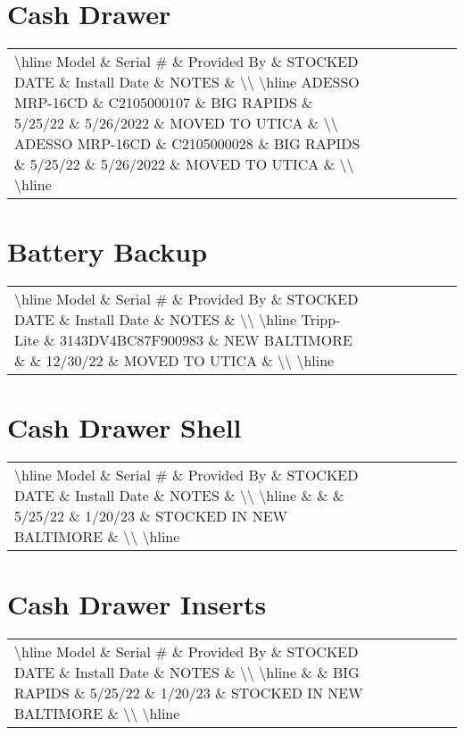 \documentclass{article}%
\begin{document}
%
\section{Cash Drawer}%
\label{sec:CashDrawer}%
\begin{tabularx}{\textwidth}{|X|X|X|X|X|X|X|}%
\textbackslash{}hline%
Model \& Serial \# \& Provided By \& STOCKED DATE \& Install Date \& NOTES \&  \textbackslash{}\textbackslash{}%
\textbackslash{}hline%
ADESSO MRP{-}16CD \& C2105000107 \& BIG RAPIDS \& 5/25/22 \& 5/26/2022 \& MOVED TO UTICA \&  \textbackslash{}\textbackslash{}%
ADESSO MRP{-}16CD \& C2105000028 \& BIG RAPIDS \& 5/25/22 \& 5/26/2022 \& MOVED TO UTICA \&  \textbackslash{}\textbackslash{}%
\textbackslash{}hline%
\end{tabularx}

%
\section{Battery Backup}%
\label{sec:BatteryBackup}%
\begin{tabularx}{\textwidth}{|X|X|X|X|X|X|X|}%
\textbackslash{}hline%
Model \& Serial \# \& Provided By \& STOCKED DATE \& Install Date \& NOTES \&  \textbackslash{}\textbackslash{}%
\textbackslash{}hline%
Tripp{-}Lite \& 3143DV4BC87F900983 \& NEW BALTIMORE \&  \& 12/30/22 \& MOVED TO UTICA \&  \textbackslash{}\textbackslash{}%
\textbackslash{}hline%
\end{tabularx}

%
\section{Cash Drawer Shell}%
\label{sec:CashDrawerShell}%
\begin{tabularx}{\textwidth}{|X|X|X|X|X|X|X|}%
\textbackslash{}hline%
Model \& Serial \# \& Provided By \& STOCKED DATE \& Install Date \& NOTES \&  \textbackslash{}\textbackslash{}%
\textbackslash{}hline%
 \&  \&  \& 5/25/22 \& 1/20/23 \& STOCKED IN NEW BALTIMORE \&  \textbackslash{}\textbackslash{}%
\textbackslash{}hline%
\end{tabularx}

%
\section{Cash Drawer Inserts }%
\label{sec:CashDrawerInserts}%
\begin{tabularx}{\textwidth}{|X|X|X|X|X|X|X|}%
\textbackslash{}hline%
Model \& Serial \# \& Provided By \& STOCKED DATE \& Install Date \& NOTES \&  \textbackslash{}\textbackslash{}%
\textbackslash{}hline%
 \&  \& BIG RAPIDS \& 5/25/22 \& 1/20/23 \& STOCKED IN NEW BALTIMORE \&  \textbackslash{}\textbackslash{}%
\textbackslash{}hline%
\end{tabularx}
\end{document}
